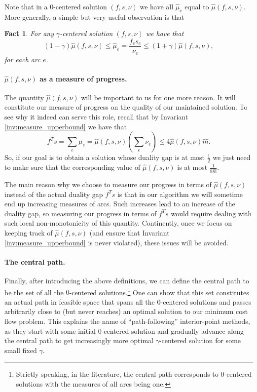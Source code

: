 \documentclass[11pt, letterpaper]{article}
\newtheorem{fact}[theorem]{Fact}
\newcommand{\hm}{\widehat{m}}
\newcommand{\hmu}{\hat{\mu}}
\newcommand{\vnu}{\boldsymbol{\mathit{\nu}}}
\newcommand{\ff}{\boldsymbol{\mathit{f}}}
\renewcommand{\ss}{\boldsymbol{\mathit{s}}}
\begin{document}
Note that in a $0$-centered solution $(\ff,\ss,\vnu)$ we have all $\hmu_e$ equal to $\hmu(\ff,\ss,\vnu)$. More generally, a simple but very useful observation is that
\begin{fact}
\label{fa:central_vs_max_min}
For any $\gamma$-centered solution $(\ff,\ss,\vnu)$ we have that
\[
(1-\gamma) \hmu(\ff,\ss,\vnu) \leq \hmu_e = \frac{f_e s_e}{\nu_e} \leq (1+\gamma) \hmu(\ff,\ss,\vnu),
\]
for each arc $e$. 
\end{fact}

\paragraph{$\hmu(\ff,\ss,\vnu)$ as a measure of progress.} The quantity $\hmu(\ff,\ss,\vnu)$ will be important to us for one more reason. It will constitute our measure of progress on the quality of our maintained solution. To see why it indeed can serve this role, recall that by Invariant \ref{inv:measure_upperbound} we have that 
\begin{equation}
\label{eq:duality_gap_bound}
\ff^T \ss = \sum_e \mu_e = \hmu(\ff,\ss,\vnu) (\sum_e \nu_e) \leq 4 \hmu(\ff,\ss,\vnu) \hm.
\end{equation}
So, if our goal is to obtain a solution whose duality gap is at most $\frac{1}{2}$ we just need to make sure that the corresponding value of $\hmu(\ff,\ss,\vnu)$ is at most $\frac{1}{8\hm}$. 

The main reason why we choose to measure our progress in terms of $\hmu(\ff,\ss,\vnu)$ instead of the actual duality gap $\ff^T\ss$ is that in our algorithm we will sometime end up increasing measures of arcs. Such increases lead to an increase of the duality gap, so measuring our progress in terms of $\ff^T\ss$ would require dealing with such local non-monotonicity of this quantity. Continently, once we focus on keeping track of  $\hmu(\ff,\ss,\vnu)$ (and ensure that Invariant \ref{inv:measure_upperbound} is never violated), these issues will be avoided.


\paragraph{The central path.} Finally, after introducing the above definitions, we can define the central path to be the set of all the $0$-centered solutions.\footnote{Strictly speaking, in the literature, the central path corresponds to $0$-centered solutions with the measures of all arcs being one.} One can show that this set constitutes an actual path in feasible space that spans all the $0$-centered solutions and passes arbitrarily close to (but never reaches) an optimal solution to our minimum cost flow problem. This explains the name of ``path-following'' interior-point methods, as they start with some initial $0$-centered solution and gradually advance along the central path to get increasingly more optimal $\gamma$-centered solution for some small fixed $\gamma$.
\end{document}

